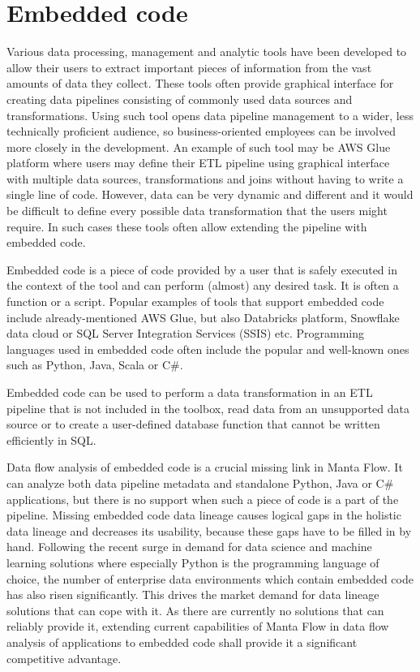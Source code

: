 \section{Embedded code}
Various data processing, management and analytic tools have been developed to allow their users to extract important pieces of information from the vast amounts of data they collect. These tools often provide graphical interface for creating data pipelines consisting of commonly used data sources and transformations. Using such tool opens data pipeline management to a wider, less technically proficient audience, so business-oriented employees can be involved more closely in the development. An example of such tool may be AWS Glue platform where users may define their ETL pipeline using graphical interface with multiple data sources, transformations and joins without having to write a single line of code. However, data can be very dynamic and different and it would be difficult to define every possible data transformation that the users might require. In such cases these tools often allow extending the pipeline with embedded code.
\par
Embedded code is a piece of code provided by a user that is safely executed in the context of the tool and can perform (almost) any desired task. It is often a function or a script. Popular examples of tools that support embedded code include already-mentioned AWS Glue, but also Databricks platform, Snowflake data cloud or SQL Server Integration Services (SSIS) etc. Programming languages used in embedded code often include the popular and well-known ones such as Python, Java, Scala or C\#.
\par
Embedded code can be used to perform a data transformation in an ETL pipeline that is not included in the toolbox, read data from an unsupported data source or to create a user-defined database function that cannot be written efficiently in SQL.
\par
Data flow analysis of embedded code is a crucial missing link in Manta Flow. It can analyze both data pipeline metadata and standalone Python, Java or C\# applications, but there is no support when such a piece of code is a part of the pipeline. Missing embedded code data lineage causes logical gaps in the holistic data lineage and decreases its usability, because these gaps have to be filled in by hand. Following the recent surge in demand for data science and machine learning solutions where especially Python is the programming language of choice, the number of enterprise data environments which contain embedded code has also risen significantly. This drives the market demand for data lineage solutions that can cope with it. As there are currently no solutions that can reliably provide it, extending current capabilities of Manta Flow in data flow analysis of applications to embedded code shall provide it a significant competitive advantage.

